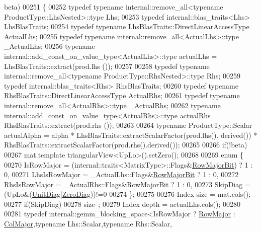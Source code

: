\begin{DoxyCode}
      beta)
00251   \{
00252     \textcolor{keyword}{typedef} \textcolor{keyword}{typename} internal::remove\_all<typename ProductType::LhsNested>::type Lhs;
00253     \textcolor{keyword}{typedef} internal::blas\_traits<Lhs> LhsBlasTraits;
00254     \textcolor{keyword}{typedef} \textcolor{keyword}{typename} LhsBlasTraits::DirectLinearAccessType ActualLhs;
00255     \textcolor{keyword}{typedef} \textcolor{keyword}{typename} internal::remove\_all<ActualLhs>::type \_ActualLhs;
00256     \textcolor{keyword}{typename} internal::add\_const\_on\_value\_type<ActualLhs>::type actualLhs = LhsBlasTraits::extract(prod.lhs
      ());
00257     
00258     \textcolor{keyword}{typedef} \textcolor{keyword}{typename} internal::remove\_all<typename ProductType::RhsNested>::type Rhs;
00259     \textcolor{keyword}{typedef} internal::blas\_traits<Rhs> RhsBlasTraits;
00260     \textcolor{keyword}{typedef} \textcolor{keyword}{typename} RhsBlasTraits::DirectLinearAccessType ActualRhs;
00261     \textcolor{keyword}{typedef} \textcolor{keyword}{typename} internal::remove\_all<ActualRhs>::type \_ActualRhs;
00262     \textcolor{keyword}{typename} internal::add\_const\_on\_value\_type<ActualRhs>::type actualRhs = RhsBlasTraits::extract(prod.rhs
      ());
00263 
00264     \textcolor{keyword}{typename} ProductType::Scalar actualAlpha = alpha * LhsBlasTraits::extractScalarFactor(prod.lhs().
      derived()) * RhsBlasTraits::extractScalarFactor(prod.rhs().derived());
00265 
00266     \textcolor{keywordflow}{if}(!beta)
00267       mat.template triangularView<UpLo>().setZero();
00268 
00269     \textcolor{keyword}{enum} \{
00270       IsRowMajor = (internal::traits<MatrixType>::Flags&\hyperlink{group__flags_gae4f56c2a60bbe4bd2e44c5b19cbe8762}{RowMajorBit}) ? 1 : 0,
00271       LhsIsRowMajor = \_ActualLhs::Flags&\hyperlink{group__flags_gae4f56c2a60bbe4bd2e44c5b19cbe8762}{RowMajorBit} ? 1 : 0,
00272       RhsIsRowMajor = \_ActualRhs::Flags&RowMajorBit ? 1 : 0,
00273       SkipDiag = (UpLo&(\hyperlink{group__enums_gga39e3366ff5554d731e7dc8bb642f83cdaddb72f888ac85d5a1c52333e54f9374b}{UnitDiag}|\hyperlink{group__enums_gga39e3366ff5554d731e7dc8bb642f83cda884ff7240392e85aa6e4b3c957e36483}{ZeroDiag}))!=0
00274     \};
00275 
00276     Index size = mat.cols();
00277     \textcolor{keywordflow}{if}(SkipDiag)
00278       size--;
00279     Index depth = actualLhs.cols();
00280 
00281     \textcolor{keyword}{typedef} internal::gemm\_blocking\_space<IsRowMajor ? \hyperlink{group__enums_ggaacded1a18ae58b0f554751f6cdf9eb13acfcde9cd8677c5f7caf6bd603666aae3}{RowMajor} : 
      \hyperlink{group__enums_ggaacded1a18ae58b0f554751f6cdf9eb13a0cbd4bdd0abcfc0224c5fcb5e4f6669a}{ColMajor},\textcolor{keyword}{typename} Lhs::Scalar,\textcolor{keyword}{typename} Rhs::Scalar,

\end{DoxyCode}
